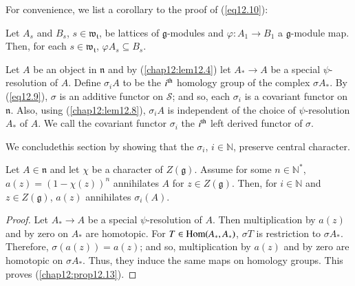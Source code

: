 For convenience, we list a corollary to the proof of (\ref{eq12.10}):

\setcounter{prop}{10}
\begin{coro}\label{chap12:coro12.11}
Let $A_s$ and $B_s$, $s \in \mathfrak{w}_\mathfrak{t}$, be lattices of
$\mathfrak{g}$-modules and $\varphi: A_1 \to B_1$ a
$\mathfrak{g}$-module map. Then, for each $s \in
\mathfrak{w}_\mathfrak{t}$, $\varphi A_s \subseteq B_s$. 
\end{coro}

\begin{definition}\label{chap12:def12.12}
Let $A$ be an object in $\mathfrak{n}$ and by (\ref{chap12:lem12.4}) let $A_* \to A$
be a special $\psi$-resolution of $A$. Define $\sigma_i A$ to be the
$i^{\rm th}$ homology group of the complex $\sigma A_*$. By (\ref{eq12.9}),
$\sigma$ is an additive functor on $\mathscr{S}$; and so, each
$\sigma_i$ is a covariant functor on $\mathfrak{n}$. Also, using
(\ref{chap12:lem12.8}), $\sigma_i A$ is independent of the choice of $\psi$-resolution
$A_*$ of $A$. We call the covariant functor $\sigma_i$ the $i^{\rm
  th}$ left derived functor of $\sigma$. 
\end{definition}

We conclude\pageoriginale this section by showing that the $\sigma_i$,
$i \in \mathbb{N}$, preserve central character. 

\begin{prop}\label{chap12:prop12.13}
Let $A \in \mathfrak{n}$ and let $\chi$ be a character of
$Z(\mathfrak{g})$. Assume for some $n \in \mathbb{N}^*$, $a(z) =
(1-\chi (z))^n$ annihilates $A$ for $z \in Z(\mathfrak{g})$. Then, for
$i \in \mathbb{N}$ and $z \in Z(\mathfrak{g})$, $a(z)$ annihilates
$\sigma_i (A)$. 
\end{prop}

\begin{proof}
Let $A_* \to A$ be a special $\psi$-resolution of $A$. Then
multiplication by $a(z)$ and by zero on $A_*$ are homotopic. For $T
\in\operatorname{Hom} (A_*, A_*)$, $\sigma T$ is restriction to $\sigma
A_*$. Therefore, $\sigma(a(z)) = a(z)$; and so, multiplication by
$a(z)$ and by zero are homotopic on $\sigma A_*$. Thus, they induce
the same maps on homology groups. This proves (\ref{chap12:prop12.13}). 
\end{proof}
